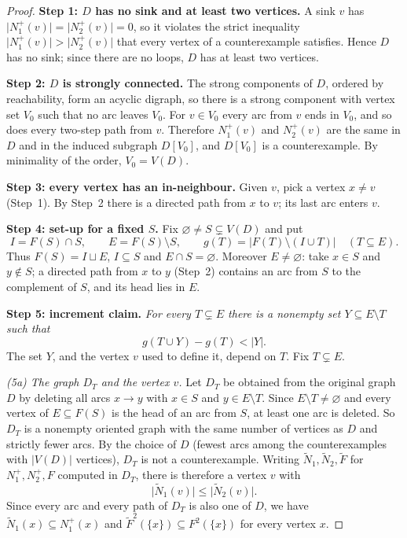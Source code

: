 \documentclass[11pt]{article}
\theoremstyle{remark}
\newcommand{\abs}[1]{\lvert #1\rvert}
\newcommand{\Step}[1]{\par\medskip\noindent\textbf{#1}\enspace}
\newcommand{\tN}{\widetilde N}
\newcommand{\tF}{\widetilde F}
\begin{document}
\begin{proof}
\Step{Step 1: $D$ has no sink and at least two vertices.}
A sink $v$ has $\abs{N_1^+(v)}=\abs{N_2^+(v)}=0$, so it violates the strict
inequality $\abs{N_1^+(v)}>\abs{N_2^+(v)}$ that every vertex of a
counterexample satisfies. Hence $D$ has no sink; since there are no loops,
$D$ has at least two vertices.

\Step{Step 2: $D$ is strongly connected.}
The strong components of $D$, ordered by reachability, form an acyclic
digraph, so there is a strong component with vertex set $V_0$ such that no
arc leaves $V_0$. For $v\in V_0$ every arc from $v$ ends in $V_0$, and so
does every two-step path from $v$. Therefore $N_1^+(v)$ and $N_2^+(v)$ are
the same in $D$ and in the induced subgraph $D[V_0]$, and $D[V_0]$ is a
counterexample. By minimality of the order, $V_0=V(D)$.

\Step{Step 3: every vertex has an in-neighbour.}
Given $v$, pick a vertex $x\ne v$ (Step~1). By Step~2 there is a directed
path from $x$ to $v$; its last arc enters $v$.

\Step{Step 4: set-up for a fixed $S$.}
Fix $\varnothing\ne S\subsetneq V(D)$ and put
\[
  I=F(S)\cap S,\qquad E=F(S)\setminus S,
  \qquad g(T)=\abs{F(T)\setminus(I\cup T)}\quad(T\subseteq E).
\]
Thus $F(S)=I\sqcup E$, $I\subseteq S$ and $E\cap S=\varnothing$. Moreover
$E\ne\varnothing$: take $x\in S$ and $y\notin S$; a directed path from $x$
to $y$ (Step~2) contains an arc from $S$ to the complement of $S$, and its
head lies in $E$.

\Step{Step 5: increment claim.}
\emph{For every $T\subsetneq E$ there is a nonempty set
$Y\subseteq E\setminus T$ such that}
\begin{equation}
\label{eq:deficit-increment}
  g(T\cup Y)-g(T)<\abs{Y}.
\end{equation}
The set $Y$, and the vertex $v$ used to define it, depend on $T$. Fix
$T\subsetneq E$.

\smallskip\noindent\emph{(5a) The graph $D_T$ and the vertex $v$.}
Let $D_T$ be obtained from the original graph $D$ by deleting all arcs
$x\to y$ with $x\in S$ and $y\in E\setminus T$. Since
$E\setminus T\ne\varnothing$ and every vertex of $E\subseteq F(S)$ is the
head of an arc from $S$, at least one arc is deleted. So $D_T$ is a nonempty
oriented graph with the same number of vertices as $D$ and strictly fewer
arcs. By the choice of $D$ (fewest arcs among the counterexamples with
$\abs{V(D)}$ vertices), $D_T$ is not a counterexample. Writing
$\tN_1,\tN_2,\tF$ for $N_1^+,N_2^+,F$ computed in $D_T$, there is therefore a
vertex $v$ with
\begin{equation}\label{eq:witness}
 \abs{\tN_1(v)}\le\abs{\tN_2(v)}.
\end{equation}
Since every arc and every path of $D_T$ is also one of $D$, we have
$\tN_1(x)\subseteq N_1^+(x)$ and $\tF^2(\{x\})\subseteq F^2(\{x\})$ for
every vertex $x$.


\end{proof}
\end{document}
